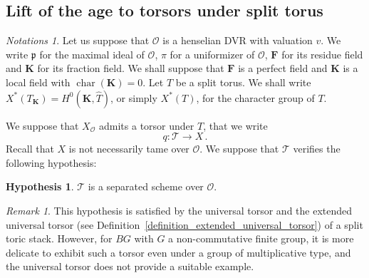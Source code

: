 \documentclass{proc-l}
\newcommand{\K}{\mathbf{K}}
\newcommand{\F}{\mathbf{F}}
\DeclareMathOperator{\car}{char}
\newcommand{\stackT}{\mathcal{T}}
\newcommand{\sheafO}{\mathcal{O}}
\theoremstyle{definition}
\newtheorem{hypothesis}[theorem]{Hypothesis}
\theoremstyle{remark}
\newtheorem{remark}[theorem]{Remark}
\newtheorem{question}[theorem]{Question}
\newtheorem{Notations}[theorem]{Notations}
\numberwithin{equation}{section}
\begin{document}







\subsection{Lift of the age to torsors under split torus}

\begin{Notations}\label{notation_anneau_valuation_discrete}
    Let us suppose that $\sheafO$ is a henselian DVR with valuation $v$. We write $\mathfrak{p}$ for the maximal ideal of $\sheafO$, $\pi$ for a uniformizer of $\sheafO$, $\F$ for its residue field and $\K$ for its fraction field. We shall suppose that $\F$ is a perfect field and $\K$ is a local field with $\car(\K) = 0$. Let $T$ be a split torus. We shall write $X^*(T_{\K}) = H^0(\K,\widehat{T})$, or simply $X^*(T)$, for the character group of $T$.

\end{Notations}

 We suppose that $X_{\sheafO}$ admits a torsor under $T$, that we write $$q : \stackT \rightarrow X \, .$$Recall that $X$ is not necessarily tame over $\sheafO$. We suppose that $\stackT$ verifies the following hypothesis:

 \begin{hypothesis}\label{hypothesis_torsor_is_a_scheme}
    $\stackT$ is a separated scheme over $\sheafO$.
\end{hypothesis}
 
\begin{remark}
    This hypothesis is satisfied by the universal torsor and the extended universal torsor
(see Definition~\ref{definition_extended_universal_torsor}) of a split toric stack. However, for $BG$ with
$G$ a non-commutative finite group, it is more delicate to exhibit such a torsor even under
a group of multiplicative type, and the universal torsor does not provide a suitable example.
\end{remark}
 
\end{document}

